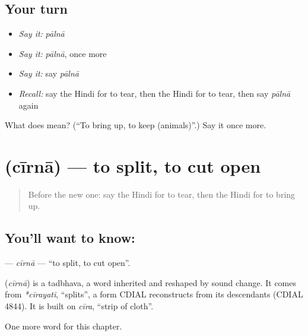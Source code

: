 \subsection*{Your turn}
\begin{itemize}
\raggedright
  \item \emph{Say it:} \emph{pālnā}
  \item \emph{Say it:} \emph{pālnā}, once more
  \item \emph{Say it:} say \emph{pālnā}
  \item \emph{Recall:} say the Hindi for to tear, then the Hindi for to tear, then say \emph{pālnā} again
\end{itemize}

\begin{tcolorbox}[breakable,colback=teal!4,colframe=teal!35!black,title={Before you move on}]
What does  mean? (\textquotedblleft{}To bring up, to keep (animals)\textquotedblright{}.) Say it once more.
\end{tcolorbox}
\section[\texorpdfstring{\hi{चीरना} (cīrnā)}{चीरना (cīrnā)}]{ (cīrnā) — to split, to cut open}

\label{lesson:HI-C227-cirna}



\begin{quote}
Before the new one: say the Hindi for to tear, then the Hindi for to bring up.
\end{quote}

\subsection*{You'll want to know: }
\textbf{} — \emph{cīrnā} — \textquotedblleft{}to split, to cut open\textquotedblright{}.

\begin{cousinweb}
\textbf{} (\emph{cīrnā}) is a tadbhava, a word inherited and reshaped by sound change. It comes from \emph{*cīrayati}, \textquotedblleft{}splits\textquotedblright{}, a form CDIAL reconstructs from its descendants (CDIAL 4844). It is built on \emph{cīra}, \textquotedblleft{}strip of cloth\textquotedblright{}.
\end{cousinweb}

\begin{grammarlens}[title={What you've built}]
One more word for this chapter.
\end{grammarlens}

